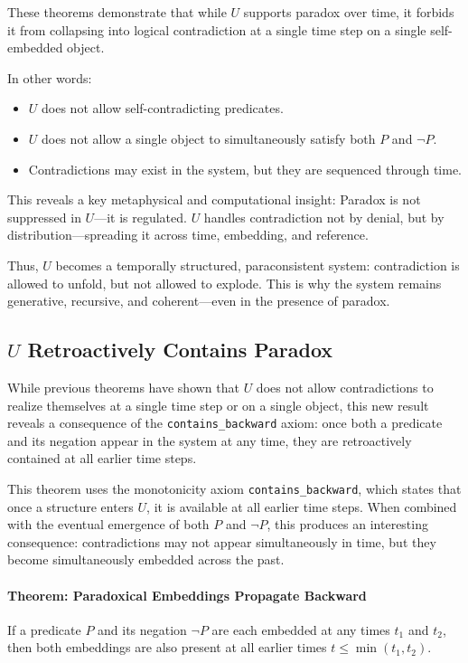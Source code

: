 \documentclass[12pt]{article}
\begin{document}
These theorems demonstrate that while \( U \) supports paradox over time, it forbids it from collapsing into logical contradiction at a single time step on a single self-embedded object.

In other words:

\begin{itemize}
    \item \( U \) does not allow self-contradicting predicates.
    \item \( U \) does not allow a single object to simultaneously satisfy both \( P \) and \( \neg P \).
    \item Contradictions may exist in the system, but they are sequenced through time.
\end{itemize}

This reveals a key metaphysical and computational insight: Paradox is not suppressed in \( U \)—it is regulated. \( U \) handles contradiction not by denial, but by distribution—spreading it across time, embedding, and reference.

Thus, \( U \) becomes a temporally structured, paraconsistent system: contradiction is allowed to unfold, but not allowed to explode. This is why the system remains generative, recursive, and coherent—even in the presence of paradox.


\subsection{\( U \) Retroactively Contains Paradox}

While previous theorems have shown that \( U \) does not allow contradictions to realize themselves at a single time step or on a single object, this new result reveals a consequence of the \texttt{contains\_backward} axiom: once both a predicate and its negation appear in the system at any time, they are retroactively contained at all earlier time steps.

This theorem uses the monotonicity axiom \texttt{contains\_backward}, which states that once a structure enters \( U \), it is available at all earlier time steps. When combined with the eventual emergence of both \( P \) and \( \neg P \), this produces an interesting consequence: contradictions may not appear simultaneously in time, but they become simultaneously embedded across the past.

\paragraph{Theorem: Paradoxical Embeddings Propagate Backward}
If a predicate \( P \) and its negation \( \neg P \) are each embedded at any times \( t_1 \) and \( t_2 \), then both embeddings are also present at all earlier times \( t \leq \min(t_1, t_2) \).
\end{document}
